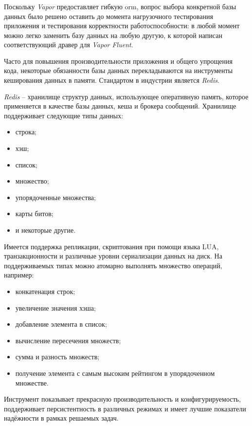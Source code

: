 \subsubsection{}
\label{sec:development:arch:pp:redis}

Поскольку \textit{Vapor} предоставляет гибкую \gls{orm}, вопрос выбора конкретной базы данных было решено оставить до момента нагрузочного тестирования приложения и тестирования корректности работоспособности: в любой момент можно легко заменить базу данных на любую другую, к которой написан соответствующий дравер для \textit{Vapor Fluent}.

Часто для повышения производительности приложения и общего упрощения кода, некоторые обязанности базы данных перекладываются на инструменты кеширования данных в памяти. Стандартом в индустрии является \textit{Redis}.

\textit{Redis} -- хранилище структур данных, использующее оперативную память, которое применяется в качестве базы данных, кеша и брокера сообщений. Хранилище поддерживает следующие типы данных:

\begin{itemize}
	\item строка;
	\item хэш;
	\item список;
	\item множество;
	\item упорядоченные множества;
	\item карты битов;
	\item и некоторые другие.
\end{itemize}

Имеется поддержка репликации, скриптования при помощи языка LUA, транзакционности и различные уровни сериализации данных на диск. На поддерживаемых типах можно атомарно выполнять множество операций, например:

\begin{itemize}
	\item конкатенация строк;
	\item увеличение значения хэша;
	\item добавление элемента в список;
	\item вычисление пересечения множеств;
	\item сумма и разность множеств;
	\item получение элемента с самым высоким рейтингом в упорядоченном множестве.
\end{itemize}

Инструмент показывает прекрасную производительность и конфигурируемость, поддерживает персистентность в различных режимах и имеет лучшие показатели надёжности в рамках решаемых задач.